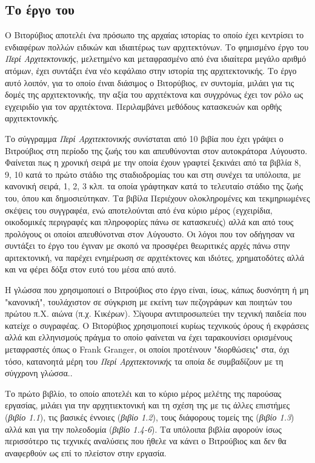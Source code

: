 \subsection{Το έργο του} 

Ο Βιτορύβιος αποτελέι ένα πρόσωπο της αρχαίας ιστορίας το οποίο έχει κεντρίσει το ενδιαφέρων πολλών ειδικών και ιδιαιτέρως των αρχιτεκτόνων. Το φημισμένο έργο του \emph{Περί Αρχιτεκτονικής}, μελετημένο και μεταφρασμένο από ένα ιδιαίτερα μεγάλο αριθμό ατόμων, έχει συντάξει ένα νέο κεφάλαιο στην ιστορία της αρχιτεκτονικής. Το έργο αυτό λοιπόν, για το οποίο έιναι διάσιμος ο Βιτορύβιος, εν συντομία, μιλάει για τις δομές της αρχιτεκτονικής,  την αξία του αρχιτέκτονα και συγχρόνως έχει τον ρόλο ως εγχειριδίο για τον αρχιτέκτονα. Περιλαμβάνει μεθόδους κατασκευών και ορθής αρχιτεκτονικής. \cite[σ. 16-18]{vitruvius-lefas}

Το σύγγραμμα \emph{Περί Αρχιτεκτονικής} συνίσταται από 10 βιβία που έχει γράψει ο Βιτρούβιος στη περίοδο της ζωής του και απευθύνονται στον αυτοκράτορα Αύγουστο. Φαίνεται πως η χρονική σειρά με την οποία έχουν γραφτεί ξεκινάει από τα βιβλία 8, 9, 10 κατά το πρώτο στάδιο της σταδιοδρομίας του και στη συνέχει τα υπόλοιπα, με κανονική σειρά, 1, 2, 3 κλπ. τα οποία γράφτηκαν κατά το τελευταίο στάδιο της ζωής του, όπου και δημοσιεύτηκαν. Τα βιβίλα Περιέχουν ολοκληρομένες και τεκμηριωμένες σκέψεις του συγγραφέα, ενώ αποτελούνται από ένα κύριο μέρος (εγχειρίδια, οικοδομικές περιγραφές και πληροφορίες πάνω σε κατασκευές) αλλά και από τους προλόγους οι οποίοι απευθύνοτναι στον Αύγουστο. Οι λόγοι που τον οδήγησαν να συντάξει το έργο του έγιναν με σκοπό να προσφέρει θεωριτικές αρχές πάνω στην αριτεκτονική, να παρέχει ενημέρωση σε αρχιτέκτονες και ιδιότες, χρηματοδότες αλλά και να φέρει δόξα στον ευτό του μέσα από αυτό. \cite[σ. 14-16]{vitruvius-lefas}

Η γλώσσα που χρησιμοποιεί ο Βιτρούβιος στο έργο είναι, ίσως, κάπως δυσνόητη ή μη "κανονική", τουλάχιστον σε σύγκριση με εκείνη των πεζογράφων και ποιητών του πρώτου π.Χ. αιώνα (π.χ. Κικέρων). Σίγουρα αντιπροσωπεύει την τεχνική παιδεία που κατείχε ο συγραφέας. Ο Βιτορύβιος χρησιμοποιεί κυρίως τεχνικούς όρους ή εκφράσεις αλλά και ελληνισμούς πράγμα το οποίο φαίνεται να έχει ταρακουνίσει ορισμένους μεταφραστές όπως ο  Frank Granger, οι οποίοι προτέινουν "διορθώσεις" στα, όχι τόσο, κατανοητά μέρη του \emph{Περί Αρχιτεκτονικής} τα οποία δε συμβαδίζουν με τη σύγχρονη γλώσσα.. \cite[σ. 18-19 και 2 αντ.]{vitruvius-lefas,scranton_vitruvius_1974}

Το πρώτο βιβλίο, το οποίο αποτελέι και το κύριο μέρος μελέτης της παρούσας εργασίας, μιλάει για την αρχητιεκτονική και τη σχέση της με τις άλλες επιστήμες (\emph{βιβίο 1.1}), τις βασικές έννοιες (\emph{βιβίο 1.2}), τους διάφορους τομείς της (\emph{βιβίο 1.3}) αλλά και για την πολεοδομία (\emph{βιβίο 1.4-6}). Τα υπόλοιπα βιβλία αφορούν ίσως περισσότερο τις τεχνικές αναλύσεις που ήθελε να κάνει ο Βιτρούβιος και δεν θα αναφερθούν ως επί το πλείστον στην εργασία. \cite[σ, 16-18, 6 και 2 αντ.]{vitruvius-lefas,masterson_status_2004,scranton_vitruvius_1974}




